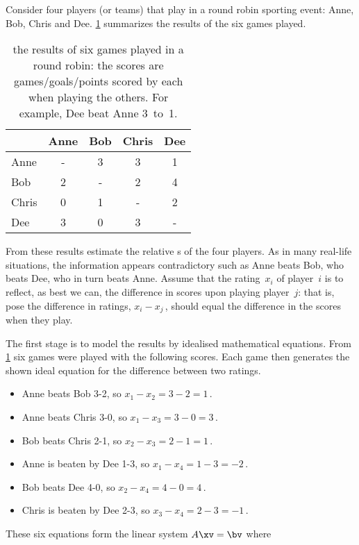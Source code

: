\begin{example} \label{eg:roundrobin1}
Consider four players (or teams) that play in a round robin sporting event: Anne, Bob, Chris and Dee.
\cref{tbl:roundrobin1} summarizes the results of the six games played.
\begin{table}
\caption{the results of six games played in a round robin: the scores are games\slash goals\slash points scored by each when playing the others.  For example, Dee beat Anne 3~to~1.}
\label{tbl:roundrobin1}
\begin{center}
\begin{tabular}{l|cccc} \hline
&Anne& Bob& Chris& Dee\\ \hline
Anne & - & 3 & 3 & 1 \\
Bob & 2 & - & 2 & 4 \\
Chris & 0 & 1 & - & 2 \\
Dee & 3 & 0 & 3 & - \\ \hline
\end{tabular}
\end{center}
\end{table}%
From these results estimate the relative s of the four players.
As in many real-life situations, the information appears contradictory such as Anne beats Bob, who beats Dee, who in turn beats Anne.
Assume that the rating~\(x_i\) of player~\(i\) is to reflect, as best we can, the difference in scores upon playing player~\(j\):  that is, pose the difference in ratings, \(x_i-x_j\)\,, should equal the difference in the scores when they play.
\begin{solution} 
The first stage is to model the results by idealised mathematical equations.
From \cref{tbl:roundrobin1} six games were played with the following scores.  
Each game then generates the shown ideal equation for the difference between two ratings.
\begin{itemize}
\item Anne beats Bob 3-2, so \(x_1-x_2=3-2=1\)\,.
\item Anne beats Chris 3-0, so \(x_1-x_3=3-0=3\)\,.
\item Bob beats Chris 2-1, so \(x_2-x_3=2-1=1\)\,.
\item Anne is beaten by Dee 1-3, so \(x_1-x_4=1-3=-2\)\,.
\item Bob beats Dee 4-0, so \(x_2-x_4=4-0=4\)\,.
\item Chris is beaten by Dee 2-3, so \(x_3-x_4=2-3=-1\)\,.
\end{itemize}
These six equations form the linear system \(A\xv=\bv\) where

\end{solution}
\end{example}

